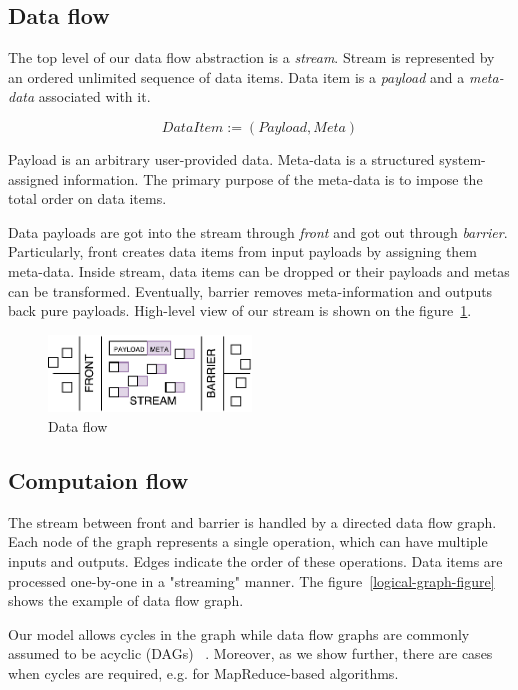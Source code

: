 
\label {fs-model}
\subsection{Data flow}

The top level of our data flow abstraction is a {\it stream}. Stream is represented by an ordered unlimited sequence of data items. Data item is a {\it payload} and a {\it meta-data} associated with it. 

\[DataItem := (Payload, Meta)\]

Payload is an arbitrary user-provided data. Meta-data is a structured system-assigned information. The primary purpose of the meta-data is to impose the total order on data items. 

Data payloads are got into the stream through {\it front} and got out through {\it barrier}. Particularly, front creates data items from input payloads by assigning them meta-data. Inside stream, data items can be dropped or their payloads and metas can be transformed. Eventually, barrier removes meta-information and outputs back pure payloads. High-level view of our stream is shown on the figure~\ref{stream}.

\begin{figure}[htbp]
  \centering
  \includegraphics[width=0.48\textwidth]{pics/stream}
  \caption{Data flow}
  \label {stream}
\end{figure}

\subsection{Computaion flow}

The stream between front and barrier is handled by a directed data flow graph. Each node of the graph represents a single operation, which can have multiple inputs and outputs. Edges indicate the order of these operations. Data items are processed one-by-one in a "streaming" manner. The figure~\ref{logical-graph-figure} shows the example of data flow graph.

Our model allows cycles in the graph while data flow graphs are commonly assumed to be acyclic (DAGs) 
~\cite{Zaharia:2016:ASU:3013530.2934664, Carbone:2017:SMA:3137765.3137777}. Moreover, as we show further, there are cases when cycles are required, e.g. for MapReduce-based algorithms. 

